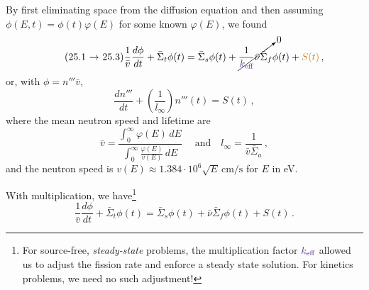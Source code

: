 \documentclass[compact]{ne630handout}
\begin{document}
\begin{handoutflow}




By first eliminating space from the diffusion equation
and then assuming $\phi(E, t) = \phi(t)\varphi(E)$ for
some known $\varphi(E)$, we found
\begin{equation*}
\tag{25.1 $\to$ 25.3}
 \frac{1}{\bar{v}}\frac{d\phi}{dt}
 + \bar{\Sigma}_t \phi(t)
  = \bar{\Sigma}_s \phi(t)
  + \cancelto{0}{\frac{1}{\textcolor{wcprimary}{k_{\text{eff}}}} \bar{\nu}\bar{\Sigma}_f}  \phi(t) + \textcolor{wcalerted}{S(t)}\, ,
\end{equation*}
or, with $\phi = n''' \bar{v}$,
\begin{equation*}
\tag{Like FNRP 5.2 and 5.7}
 \frac{dn'''}{dt} +  \left ( \frac{1}{l_{\infty}} \right ) n'''(t)  = S(t) \, ,
\end{equation*}
where the mean neutron speed and lifetime are
\begin{equation*}
 \bar v=\frac{\displaystyle \int_0^\infty \varphi(E)\,dE}{\displaystyle \int_0^\infty \frac{\varphi(E)}{v(E)}\,dE}\;
 \quad \text{and} \quad
 l_{\infty} = \frac{1}{\bar{v} \bar{\Sigma}_a} \, ,
\end{equation*}
and the neutron speed is $v(E) \approx 1.384\cdot 10^{6}\sqrt{E} \, \si{\centi\meter\per\second}$ for $E$ in \si{\electronvolt}.





With multiplication, we have\footnote{For source-free, {\it steady-state} problems, the multiplication factor $\textcolor{wcprimary}{k_{\text{eff}}}$ allowed us to adjust the fission rate and enforce a steady state solution.  For kinetics problems, we need no such adjustment!}
\begin{equation*}
\tag{26.1}
  \frac{1}{\bar{v}}\frac{d\phi}{dt}
 + \bar{\Sigma}_t \phi(t)
  = \bar{\Sigma}_s \phi(t)  +  \bar{\nu}\bar{\Sigma}_f \phi(t) +  S(t)  \, .
\end{equation*}





\end{handoutflow}
\end{document}
